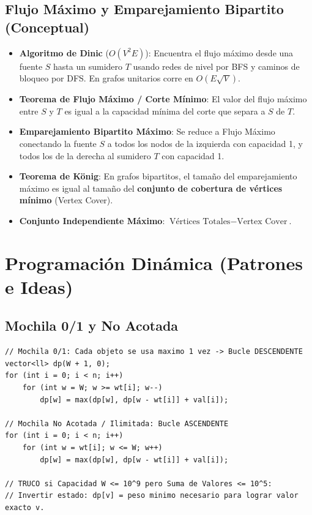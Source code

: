 \documentclass[9pt,twocolumn,a4paper]{extarticle}
\begin{document}
\subsection{Flujo Máximo y Emparejamiento Bipartito (Conceptual)}
\begin{itemize}
    \setlength{\itemsep}{0pt}
    \item \textbf{Algoritmo de Dinic} ($O(V^2 E)$): Encuentra el flujo máximo desde una fuente $S$ hasta un sumidero $T$ usando redes de nivel por BFS y caminos de bloqueo por DFS. En grafos unitarios corre en $O(E \sqrt{V})$.
    \item \textbf{Teorema de Flujo Máximo / Corte Mínimo}: El valor del flujo máximo entre $S$ y $T$ es igual a la capacidad mínima del corte que separa a $S$ de $T$.
    \item \textbf{Emparejamiento Bipartito Máximo}: Se reduce a Flujo Máximo conectando la fuente $S$ a todos los nodos de la izquierda con capacidad 1, y todos los de la derecha al sumidero $T$ con capacidad 1.
    \item \textbf{Teorema de König}: En grafos bipartitos, el tamaño del emparejamiento máximo es igual al tamaño del \textbf{conjunto de cobertura de vértices mínimo} (Vertex Cover).
    \item \textbf{Conjunto Independiente Máximo}: $\text{Vértices Totales} - \text{Vertex Cover}$.
\end{itemize}

\section{Programación Dinámica (Patrones e Ideas)}
\subsection{Mochila 0/1 y No Acotada}
\begin{lstlisting}
// Mochila 0/1: Cada objeto se usa maximo 1 vez -> Bucle DESCENDENTE
vector<ll> dp(W + 1, 0);
for (int i = 0; i < n; i++)
    for (int w = W; w >= wt[i]; w--)
        dp[w] = max(dp[w], dp[w - wt[i]] + val[i]);

// Mochila No Acotada / Ilimitada: Bucle ASCENDENTE
for (int i = 0; i < n; i++)
    for (int w = wt[i]; w <= W; w++)
        dp[w] = max(dp[w], dp[w - wt[i]] + val[i]);

// TRUCO si Capacidad W <= 10^9 pero Suma de Valores <= 10^5:
// Invertir estado: dp[v] = peso minimo necesario para lograr valor exacto v.
\end{lstlisting}
\end{document}
